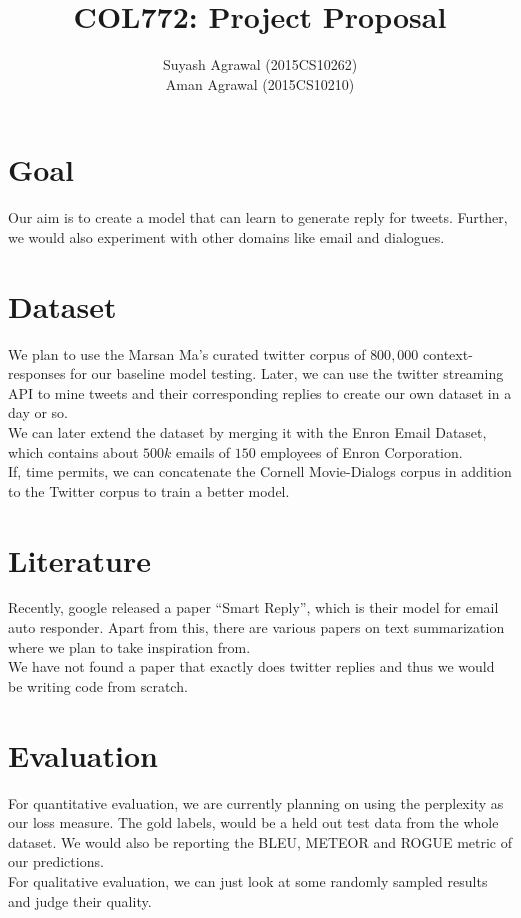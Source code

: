 \documentclass[10pt,a4paper]{article}
\title{COL772: Project Proposal}
\author{Suyash Agrawal (2015CS10262) \\ Aman Agrawal (2015CS10210)}
\begin{document}
\maketitle
\section{Goal}
    Our aim is to create a model that can learn to generate reply for tweets. Further, we would also experiment
    with other domains like email and dialogues.


\section{Dataset}
We plan to use the Marsan Ma’s curated twitter corpus of $800,000$ context-responses\cite{data:twitter-marson} for our baseline model testing. Later, we can use the twitter streaming API to mine tweets and their corresponding replies to create our own dataset in a day or so.\\
We can later extend the dataset by merging it with the Enron Email Dataset, which contains about $500k$ emails of $150$ employees of Enron Corporation\cite{data:enron}. \\
If, time permits, we can concatenate the Cornell Movie-Dialogs corpus \cite{data:cornell-movie} in addition to the Twitter corpus to train a better model.   

\section{Literature}
    Recently, google released a paper ``Smart Reply''\cite{paper:smartReply}, which is their model for 
    email auto responder. Apart from this, there are various papers on text summarization\cite{paper:pointer}
    where we plan to take inspiration from.\\
    We have not found a paper that exactly does twitter replies and thus we would be writing code from scratch.
\section{Evaluation}
    For quantitative evaluation, we are currently planning on using the perplexity as our loss measure. The gold
    labels, would be a held out test data from the whole dataset. We would also be reporting the BLEU, METEOR and
    ROGUE metric of our predictions.\\
    For qualitative evaluation, we can just look at some randomly sampled results and judge their quality.

    
    
\end{document}
